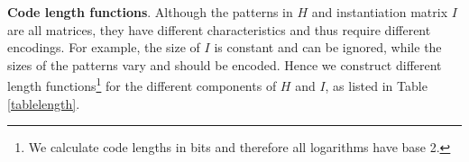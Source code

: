 \documentclass{llncs}
\begin{document}
 




\smallskip
\noindent \textbf{Code length functions}.
Although the patterns in $H$ and instantiation matrix $I$ are all matrices, they have different characteristics and thus require different encodings. For example, the size of $I$ is constant and can be ignored, while the sizes of the patterns vary and should be encoded. Hence we construct different length functions\footnote{We calculate code lengths in bits and therefore all logarithms have base 2.} for the different components of $H$ and $I$, as listed in Table \ref{tablelength}. 
\end{document}
